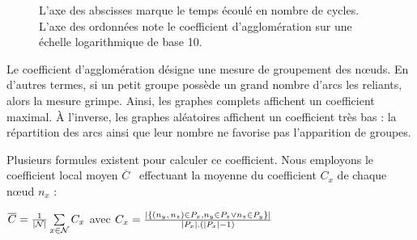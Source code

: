 \begin{figure}
  \centering
  \hspace{10pt}
  \caption[Coefficient d'agglomération]{\label{net:fig:clustering}L'axe des
    abscisses marque le temps écoulé en nombre de cycles. L'axe des ordonnées
    note le coefficient d'agglomération sur une échelle logarithmique de base
    10.}
\end{figure}

Le coefficient d'agglomération désigne une mesure de groupement des nœuds. En
d'autres termes, si un petit groupe possède un grand nombre d'arcs les reliants,
alors la mesure grimpe. Ainsi, les graphes complets affichent un coefficient
maximal. À l'inverse, les graphes aléatoires affichent un coefficient très bas :
la répartition des arcs ainsi que leur nombre ne favorise pas l'apparition de
groupes.

Plusieurs formules existent pour calculer ce coefficient. Nous employons le
coefficient local moyen $\overline{C}$~\cite{watts1998collective} effectuant la
moyenne du coefficient $C_x$ de chaque nœud $n_x$ :
\begin{center}
  $\overline{C} = {1\over |\mathcal{N}|}\sum\limits_{x\in\mathcal{N}}C_x$ \hfill
  avec
  $C_x = {|\{ (n_y,\,n_z) \in P_x, n_y \in P_z \vee n_z \in P_y \}|\over
    |P_x|.(|P_x|-1)}$
\end{center}

